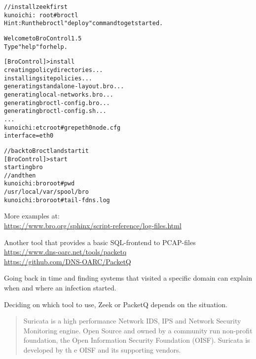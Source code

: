 \documentclass[Screen16to9,17pt]{foils}
\begin{document}
\begin{alltt}\small
// install zeek first
kunoichi:~ root# broctl
Hint: Run the broctl "deploy" command to get started.

Welcome to BroControl 1.5
Type "help" for help.

[BroControl] > install
creating policy directories ...
installing site policies ...
generating standalone-layout.bro ...
generating local-networks.bro ...
generating broctl-config.bro ...
generating broctl-config.sh ...
...
kunoichi:etc root# grep eth0 node.cfg
interface=eth0
\end{alltt}


\begin{alltt}\small
// back to Broctl and start it
[BroControl] > start
starting bro
// and then
kunoichi:bro root# pwd
/usr/local/var/spool/bro
kunoichi:bro root# tail -f dns.log
\end{alltt}

More examples at:\\
\url{https://www.bro.org/sphinx/script-reference/log-files.html}



Another tool that provides a basic SQL-frontend to PCAP-files\\
\url{https://www.dns-oarc.net/tools/packetq}\\
\url{https://github.com/DNS-OARC/PacketQ}

Going back in time and finding systems that visited a specific domain can explain when and where an infection started.

Deciding on which tool to use, Zeek or PacketQ depends on the situation.



\begin{quote}
Suricata is a high performance Network IDS, IPS and Network Security Monitoring engine. Open Source and owned by a
 community run non-profit foundation, the Open Information Security Foundation (OISF). Suricata is developed by th
e OISF and its supporting vendors.
\end{quote}



\end{document}
